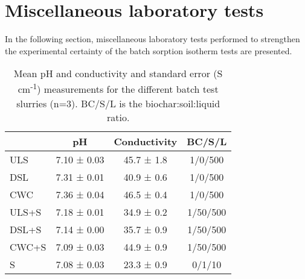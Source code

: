 \chapter{Miscellaneous laboratory tests}\label{appSec:misclab}

In the following section, miscellaneous laboratory tests performed to strengthen the experimental certainty of the batch sorption isotherm tests are presented. 

\begin{table}
\centering
\caption{Mean pH and conductivity and standard error (\textmu S cm\textsuperscript{-1}) measurements for the different batch test slurries (n=3). BC/S/L is the biochar:soil:liquid ratio.}
\label{apptab:pHcond}
\begin{tabular}{lccc}
\toprule
 & \multicolumn{1}{c}{pH} & \multicolumn{1}{c}{Conductivity} & BC/S/L\\ \midrule
ULS   & 7.10 ± 0.03 & 45.7 ± 1.8 & 1/0/500\\
DSL   & 7.31 ± 0.01 & 40.9 ± 0.6 & 1/0/500\\
CWC   & 7.36 ± 0.04 & 46.5 ± 0.4 & 1/0/500\\
ULS+S & 7.18 ± 0.01 & 34.9 ± 0.2 & 1/50/500\\
DSL+S & 7.14 ± 0.00 & 35.7 ± 0.9 & 1/50/500\\
CWC+S & 7.09 ± 0.03 & 44.9 ± 0.9 & 1/50/500\\
S     & 7.08 ± 0.03 & 23.3 ± 0.9 & 0/1/10\\
\bottomrule
\end{tabular}
\end{table}

